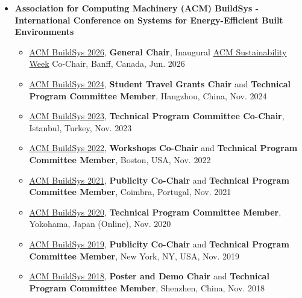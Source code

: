 \documentclass[10pt,a4paper]{article}
\begin{document}
\begin{small}
\begin{itemize}
\item
\textbf{Association for Computing Machinery (ACM) BuildSys - International Conference on Systems for Energy-Efficient Built Environments}
\begin{itemize}
\item \href{https://buildsys.acm.org/2026}{ACM BuildSys 2026}, \textbf{General Chair}, Inaugural \href{https://energy.acm.org/sustainability-week/}{ACM Sustainability Week} Co-Chair, Banff, Canada, Jun. 2026
\item \href{https://buildsys.acm.org/2024/}{ACM BuildSys 2024}, \textbf{Student Travel Grants Chair} and \textbf{Technical Program Committee Member}, Hangzhou, China, Nov. 2024
\item \href{https://buildsys.acm.org/2023/}{ACM BuildSys 2023}, \textbf{Technical Program Committee Co-Chair}, Istanbul, Turkey, Nov. 2023
\item \href{https://buildsys.acm.org/2022/}{ACM BuildSys 2022}, \textbf{Workshops Co-Chair} and \textbf{Technical Program Committee Member}, Boston, USA, Nov. 2022
\item \href{https://buildsys.acm.org/2020/}{ACM BuildSys 2021}, \textbf{Publicity Co-Chair} and \textbf{Technical Program Committee Member}, Coimbra, Portugal, Nov. 2021
\item \href{https://buildsys.acm.org/2020/}{ACM BuildSys 2020}, \textbf{Technical Program Committee Member}, Yokohama, Japan (Online), Nov. 2020
\item \href{https://buildsys.acm.org/2019/}{ACM BuildSys 2019}, \textbf{Publicity Co-Chair} and \textbf{Technical Program Committee Member}, New York, NY, USA, Nov. 2019
\item \href{https://buildsys.acm.org/2018/}{ACM BuildSys 2018}, \textbf{Poster and Demo Chair} and \textbf{Technical Program Committee Member}, Shenzhen, China, Nov. 2018
\end{itemize}


\end{itemize}
\end{small}
\end{document}
